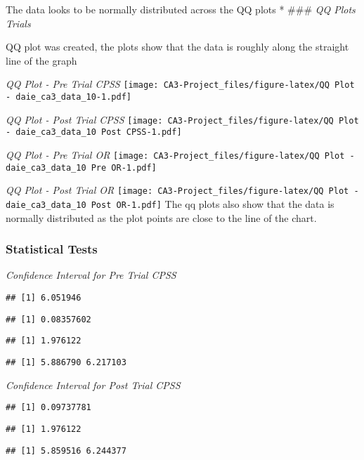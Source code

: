\documentclass[
]{article}
\begin{document}
The data looks to be normally distributed across the QQ plots * \#\#\#
\emph{QQ Plots Trials}

QQ plot was created, the plots show that the data is roughly along the
straight line of the graph

\emph{QQ Plot - Pre Trial CPSS}
\texttt{[image: CA3-Project\_files/figure-latex/QQ Plot - daie\_ca3\_data\_10-1.pdf]}

\emph{QQ Plot - Post Trial CPSS}
\texttt{[image: CA3-Project\_files/figure-latex/QQ Plot - daie\_ca3\_data\_10 Post CPSS-1.pdf]}

\emph{QQ Plot - Pre Trial OR}
\texttt{[image: CA3-Project\_files/figure-latex/QQ Plot - daie\_ca3\_data\_10 Pre OR-1.pdf]}

\emph{QQ Plot - Post Trial OR}
\texttt{[image: CA3-Project\_files/figure-latex/QQ Plot - daie\_ca3\_data\_10 Post OR-1.pdf]}
The qq plots also show that the data is normally distributed as the plot
points are close to the line of the chart.

\hypertarget{statistical-tests}{%
\subsubsection{\texorpdfstring{\textbf{Statistical
Tests}}{Statistical Tests}}\label{statistical-tests}}

\emph{Confidence Interval for Pre Trial CPSS}

\begin{verbatim}
## [1] 6.051946
\end{verbatim}

\begin{verbatim}
## [1] 0.08357602
\end{verbatim}

\begin{verbatim}
## [1] 1.976122
\end{verbatim}

\begin{verbatim}
## [1] 5.886790 6.217103
\end{verbatim}

\emph{Confidence Interval for Post Trial CPSS}

\begin{verbatim}
## [1] 0.09737781
\end{verbatim}

\begin{verbatim}
## [1] 1.976122
\end{verbatim}

\begin{verbatim}
## [1] 5.859516 6.244377
\end{verbatim}
\end{document}

